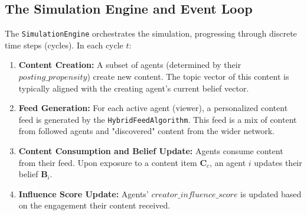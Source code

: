 \documentclass[10pt,a4paper]{article}
\newcommand{\belief}{\mathbf{B}}
\newcommand{\contentvec}{\mathbf{C}}
\begin{document}
\subsection{The Simulation Engine and Event Loop}
The \texttt{SimulationEngine} orchestrates the simulation, progressing through discrete time steps (cycles). In each cycle $t$:
\begin{enumerate}
    \item \textbf{Content Creation:} A subset of agents (determined by their $posting\_propensity$) create new content. The topic vector of this content is typically aligned with the creating agent's current belief vector.
    \item \textbf{Feed Generation:} For each active agent (viewer), a personalized content feed is generated by the \texttt{HybridFeedAlgorithm}. This feed is a mix of content from followed agents and "discovered" content from the wider network.
    \item \textbf{Content Consumption and Belief Update:} Agents consume content from their feed. Upon exposure to a content item $\contentvec_c$, an agent $i$ updates their belief $\belief_i$.
    \item \textbf{Influence Score Update:} Agents' $creator\_influence\_score$ is updated based on the engagement their content received.
\end{enumerate}
\end{document}
